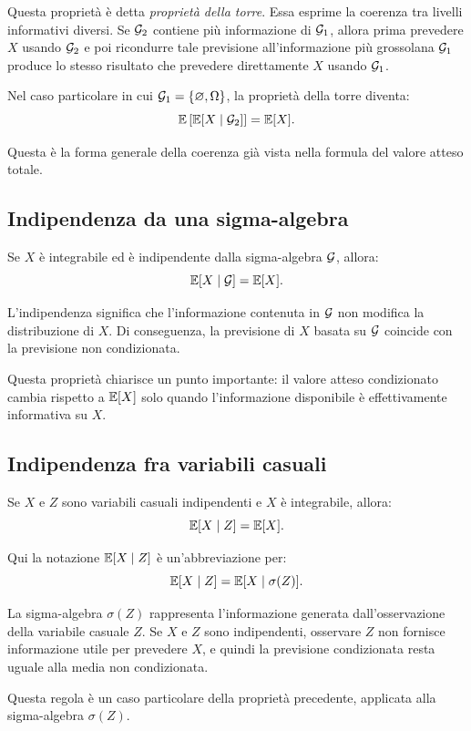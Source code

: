 Questa propriet\`{a} \`{e} detta \textit{propriet\`{a} della torre}. Essa esprime la
coerenza tra livelli informativi diversi. Se $\mathcal{G}_2$ contiene pi\`{u}
informazione di $\mathcal{G}_1$, allora prima prevedere $X$ usando
$\mathcal{G}_2$ e poi ricondurre tale previsione all'informazione pi\`{u}
grossolana $\mathcal{G}_1$ produce lo stesso risultato che prevedere
direttamente $X$ usando $\mathcal{G}_1$.

Nel caso particolare in cui $\mathcal{G}_1=\{\varnothing,\Omega\}$, la
propriet\`{a} della torre diventa:
\[
\mathbb{E}\left[
\mathbb{E}[X\mid\mathcal{G}_2]
\right]
=
\mathbb{E}[X].
\]

Questa \`{e} la forma generale della coerenza gi\`{a} vista nella formula del
valore atteso totale.

\subsection{Indipendenza da una sigma-algebra}

Se $X$ \`{e} integrabile ed \`{e} indipendente dalla sigma-algebra
$\mathcal{G}$, allora:
\[
\mathbb{E}[X\mid\mathcal{G}]
=
\mathbb{E}[X].
\]

L'indipendenza significa che l'informazione contenuta in $\mathcal{G}$ non
modifica la distribuzione di $X$. Di conseguenza, la previsione di $X$ basata
su $\mathcal{G}$ coincide con la previsione non condizionata.

Questa propriet\`{a} chiarisce un punto importante: il valore atteso
condizionato cambia rispetto a $\mathbb{E}[X]$ solo quando l'informazione
disponibile \`{e} effettivamente informativa su $X$.

\subsection{Indipendenza fra variabili casuali}

Se $X$ e $Z$ sono variabili casuali indipendenti e $X$ \`{e} integrabile,
allora:
\[
\mathbb{E}[X\mid Z]
=
\mathbb{E}[X].
\]

Qui la notazione $\mathbb{E}[X\mid Z]$ \`{e} un'abbreviazione per:
\[
\mathbb{E}[X\mid Z]
=
\mathbb{E}[X\mid\sigma(Z)].
\]

La sigma-algebra $\sigma(Z)$ rappresenta l'informazione generata
dall'osservazione della variabile casuale $Z$. Se $X$ e $Z$ sono indipendenti,
osservare $Z$ non fornisce informazione utile per prevedere $X$, e quindi la
previsione condizionata resta uguale alla media non condizionata.

Questa regola \`{e} un caso particolare della propriet\`{a} precedente,
applicata alla sigma-algebra $\sigma(Z)$.

